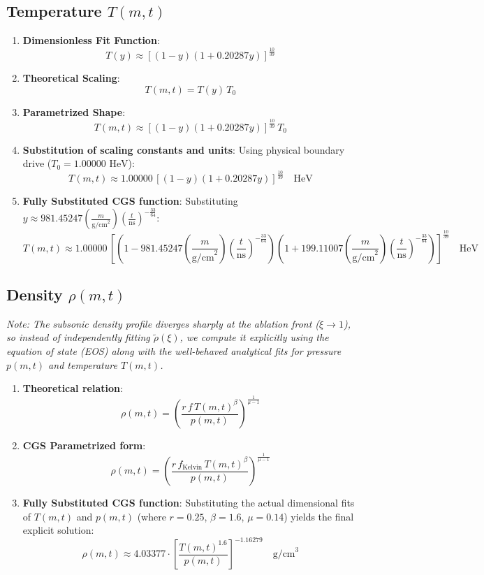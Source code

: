 \documentclass[11pt]{article}
\begin{document}
\subsection{Temperature $T(m,t)$}
\begin{enumerate}
    \item \textbf{Dimensionless Fit Function}:
    $$T(y) \approx \left[ (1 - y)(1 + 0.20287 y) \right]^{\frac{10}{39}}$$
    \item \textbf{Theoretical Scaling}:
    $$T(m,t) = T(y) \, T_0$$
    \item \textbf{Parametrized Shape}:
    $$T(m,t) \approx \left[ (1 - y)(1 + 0.20287 y) \right]^{\frac{10}{39}} \, T_0$$
    \item \textbf{Substitution of scaling constants and units}:
    Using physical boundary drive ($T_0 = 1.00000 \text{ HeV}$):
    $$T(m,t) \approx 1.00000 \, \left[ (1 - y)(1 + 0.20287 y) \right]^{\frac{10}{39}} \quad \text{HeV}$$
    \item \textbf{Fully Substituted CGS function}:
    Substituting $y \approx 981.45247 \left(\frac{m}{\text{g/cm}^2}\right) \left(\frac{t}{\text{ns}}\right)^{-\frac{33}{64}}$:
    $$T(m,t) \approx 1.00000 \, \left[ \left(1 - 981.45247 \left(\frac{m}{\text{g/cm}^2}\right) \left(\frac{t}{\text{ns}}\right)^{-\frac{33}{64}}\right)\left(1 + 199.11007 \left(\frac{m}{\text{g/cm}^2}\right) \left(\frac{t}{\text{ns}}\right)^{-\frac{33}{64}}\right) \right]^{\frac{10}{39}} \quad \text{HeV}$$
\end{enumerate}

\subsection{Density $\rho(m,t)$}
\textit{Note: The subsonic density profile diverges sharply at the ablation front ($\xi \to 1$), so instead of independently fitting $\tilde{\rho}(\xi)$, we compute it explicitly using the equation of state (EOS) along with the well-behaved analytical fits for pressure $p(m,t)$ and temperature $T(m,t)$.}
\begin{enumerate}
    \item \textbf{Theoretical relation}:
    $$\rho(m,t) = \left( \frac{r \, f \, T(m,t)^\beta}{p(m,t)} \right)^{\frac{1}{\mu-1}}$$
    \item \textbf{CGS Parametrized form}:
    $$\rho(m,t) = \left( \frac{r \, f_{\text{Kelvin}} \, T(m,t)^\beta}{p(m,t)} \right)^{\frac{1}{\mu-1}}$$
    \item \textbf{Fully Substituted CGS function}:
    Substituting the actual dimensional fits of $T(m,t)$ and $p(m,t)$ (where $r=0.25$, $\beta=1.6$, $\mu=0.14$) yields the final explicit solution:
    $$\rho(m,t) \approx 4.03377 \cdot \left[ \frac{T(m,t)^{1.6}}{p(m,t)} \right]^{-1.16279} \quad \text{g/cm}^3$$
\end{enumerate}
\end{document}
